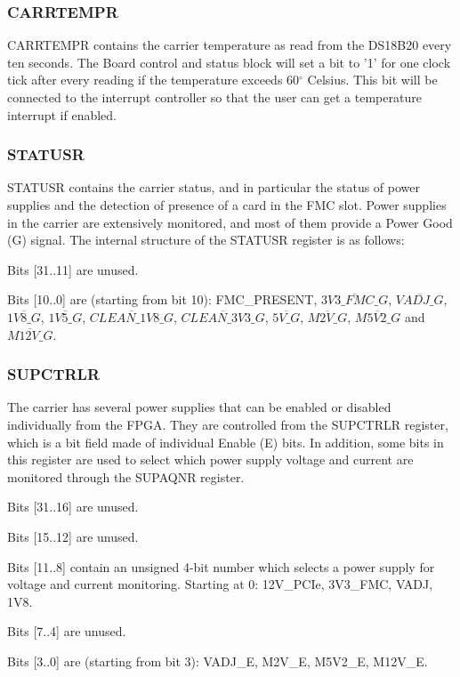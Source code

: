\documentclass{article}
\newenvironment{packed_item}{
\begin{itemize}
  \setlength{\itemsep}{1pt}
  \setlength{\parskip}{0pt}
  \setlength{\parsep}{0pt}
}{\end{itemize}}
\begin{document}
\subsubsection{CARRTEMPR}
CARRTEMPR contains the carrier temperature as read from the DS18B20 every ten seconds. The Board control and status block will set a bit to '1' for one clock tick after every reading if the temperature exceeds 60$^\circ$ Celsius. This bit will be connected to the interrupt controller so that the user can get a temperature interrupt if enabled. 

\subsubsection{STATUSR}
STATUSR contains the carrier status, and in particular the status of power supplies and the detection of presence of a card in the FMC slot. Power supplies in the carrier are extensively monitored, and most of them provide a Power Good (G) signal. The internal structure of the STATUSR register is as follows:
\begin{packed_item}
\item Bits [31..11] are unused.
\item Bits [10..0] are (starting from bit 10): FMC\_PRESENT, $\overline{3V3\_FMC\_G}$,  $\overline{VADJ\_G}$, $\overline{1V8\_G}$,  $\overline{1V5\_G}$,  $\overline{CLEAN\_1V8\_G}$, $\overline{CLEAN\_3V3\_G}$, $\overline{5V\_G}$, \linebreak$\overline{M2V\_G}$, $\overline{M5V2\_G}$ and $\overline{M12V\_G}$.
\end{packed_item}

\subsubsection{SUPCTRLR}
The carrier has several power supplies that can be enabled or disabled individually from the FPGA. They are controlled from the SUPCTRLR register, which is a bit field made of individual Enable (E) bits. In addition, some bits in this register are used to select which power supply voltage and current are monitored through the SUPAQNR register.
\begin{packed_item}
\item Bits [31..16] are unused.
\item Bits [15..12] are unused.
\item Bits [11..8] contain an unsigned 4-bit number which selects a power supply for voltage and current monitoring. Starting at 0: 12V\_PCIe, 3V3\_FMC, VADJ, 1V8.
\item Bits [7..4] are unused.
\item Bits [3..0] are (starting from bit 3): VADJ\_E, M2V\_E, M5V2\_E, M12V\_E.
\end{packed_item}
\end{document}
